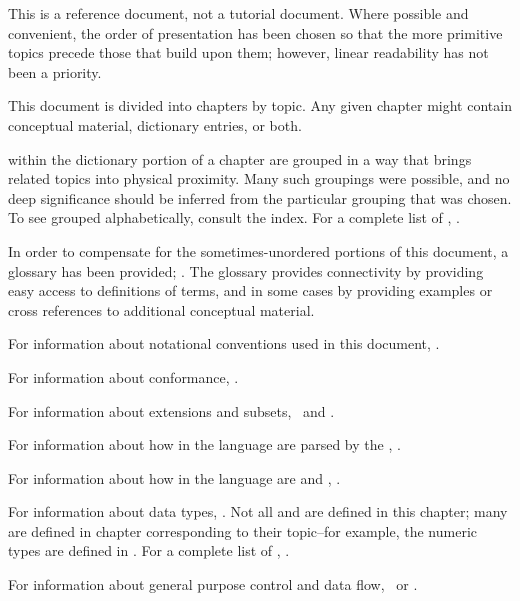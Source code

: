 
This is a reference document, not a tutorial document.  Where possible
and convenient, the order of presentation has been chosen so that the
more primitive topics precede those that build upon them;  however,
linear readability has not been a priority.

This document is divided into chapters by topic.
Any given chapter might contain conceptual material, dictionary entries, or both.

 within the dictionary portion of a chapter are
grouped in a way that brings related topics into physical proximity.
Many such groupings were possible,
and no deep significance should be inferred from the particular grouping that was chosen.
To see  grouped alphabetically, consult the index.
For a complete list of , \seesection\CLsymbols.

In order to compensate for the sometimes-unordered portions of this document, 
a glossary has been provided; \seechapter\Glossary.
The glossary provides connectivity by providing easy access to 
definitions of terms, and in some cases by providing examples or 
cross references to additional conceptual material.

For information about notational conventions used in this document,
\seesection\Definitions.

For information about conformance, \seesection\Conformance. 

For information about extensions and subsets, \seesection\LanguageExtensions\
and \secref\LanguageSubsets.

For information about how  in the language are parsed by the
\term{Lisp reader}, \seechapter\Syntax.

For information about how  in the language are 
and \term{executed}, \seechapter\EvaluationAndCompilation.

For information about data types, \seechapter\TypesAndClasses.
Not all  and  are defined in this chapter;
many are defined in chapter corresponding to their topic--for example,
the numeric types are defined in \chapref\Numbers.
For a complete list of  , 
\seefigure\StandardizedAtomicTypeSpecs.

For information about general purpose control and data flow,
\seechapter\DataAndControlFlow\ or \chapref\Iteration.

